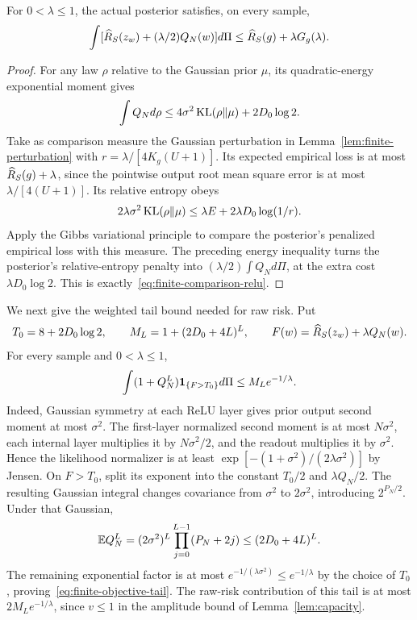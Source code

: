 \begin{lemma}
\label{lem:finite-comparison-relu}
For $0<\lambda\leq1$, the actual posterior satisfies, on every sample,
\begin{equation}
 \int[\widehat R_S(z_w)+(\lambda/2)Q_N(w)]d\Pi
       \leq\widehat R_S(g)+\lambda G_g(\lambda).
 \label{eq:finite-comparison-relu}
\end{equation}
\end{lemma}
\begin{proof}
For any law $\rho$ relative to the Gaussian prior $\mu$, its quadratic-energy exponential moment gives
\[
 \int Q_Nd\rho\leq4\sigma^2\operatorname{KL}(\rho\|\mu)+2D_0\log2.
\]
Take as comparison measure the Gaussian perturbation in Lemma~\ref{lem:finite-perturbation} with $r=\lambda/[4K_g(U+1)]$. Its expected empirical loss is at most $\widehat R_S(g)+\lambda$, since the pointwise output root mean square error is at most $\lambda/[4(U+1)]$. Its relative entropy obeys
\[
 2\lambda\sigma^2\operatorname{KL}(\rho\|\mu)
 \leq\lambda E+2\lambda D_0\log(1/r).
\]
Apply the Gibbs variational principle to compare the posterior's penalized empirical loss with this measure. The preceding energy inequality turns the posterior's relative-entropy penalty into $(\lambda/2)\int Q_Nd\Pi$, at the extra cost $\lambda D_0\log2$. This is exactly~\eqref{eq:finite-comparison-relu}.
\end{proof}

We next give the weighted tail bound needed for raw risk. Put
\[
 T_0=8+2D_0\log2,\qquad M_L=1+(2D_0+4L)^L,
 \qquad F(w)=\widehat R_S(z_w)+\lambda Q_N(w).
\]
For every sample and $0<\lambda\leq1$,
\begin{equation}
 \int(1+Q_N^L)\mathbf 1_{\{F>T_0\}}d\Pi\leq M_Le^{-1/\lambda}.
 \label{eq:finite-objective-tail}
\end{equation}
Indeed, Gaussian symmetry at each ReLU layer gives prior output second moment at most $\sigma^2$. The first-layer normalized second moment is at most $N\sigma^2$, each internal layer multiplies it by $N\sigma^2/2$, and the readout multiplies it by $\sigma^2$. Hence the likelihood normalizer is at least $\exp[-(1+\sigma^2)/(2\lambda\sigma^2)]$ by Jensen. On $F>T_0$, split its exponent into the constant $T_0/2$ and $\lambda Q_N/2$. The resulting Gaussian integral changes covariance from $\sigma^2$ to $2\sigma^2$, introducing $2^{P_N/2}$. Under that Gaussian,
\[
 \mathbb E Q_N^L=(2\sigma^2)^L\prod_{j=0}^{L-1}(P_N+2j)
              \leq(2D_0+4L)^L.
\]
The remaining exponential factor is at most $e^{-1/(\lambda\sigma^2)}\leq e^{-1/\lambda}$ by the choice of $T_0$, proving~\eqref{eq:finite-objective-tail}. The raw-risk contribution of this tail is at most $2M_Le^{-1/\lambda}$, since $v\leq1$ in the amplitude bound of Lemma~\ref{lem:capacity}.

